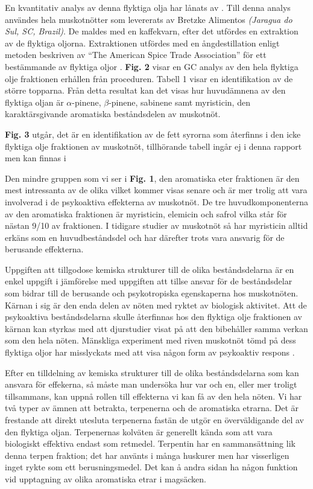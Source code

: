 \documentclass{theme/franska}
\begin{document}
En kvantitativ analys av denna flyktiga olja har lånats av \cite{spricigo1999extraction}.
Till denna analys användes hela muskotnötter som levererats av Bretzke Alimentos \textit{(Jaragua do Sul, SC, Brazil)}. De maldes med en kaffekvarn, efter det utfördes
en extraktion av de flyktiga oljorna. Extraktionen utfördes med en ångdestillation enligt metoden beskriven av ``The American Spice Trade Association'' för ett bestämmande av flyktiga oljor
\cite[citerad av Ferreira]{spricigo1999extraction}.
\textbf{Fig. 2} visar en GC analys av den hela flyktiga olje fraktionen erhållen
från proceduren. Tabell 1 visar en identifikation av de större topparna.
Från detta resultat kan det visas hur huvudämnena av den flyktiga oljan är $\alpha$-pinene, $\beta$-pinene, sabinene samt myristicin, den karaktärsgivande aromatiska beståndsdelen av muskotnöt.

\textbf{Fig. 3} utgår, det är en identifikation av de fett syrorna som återfinns i den icke flyktiga olje fraktionen av muskotnöt, tillhörande tabell ingår ej i denna rapport men kan finnas i \cite[s.258]{spricigo1999extraction}

Den mindre gruppen som vi ser i \textbf{Fig. 1}, den aromatiska
eter fraktionen är den mest intressanta av de olika vilket kommer visas senare
och är mer trolig att vara involverad i de psykoaktiva effekterna av
muskotnöt.
De tre huvudkomponenterna av den aromatiska fraktionen är myristicin, elemicin
och safrol vilka står för nästan 9/10 av fraktionen.
I tidigare studier av muskotnöt så har myristicin alltid erkäns som en
huvudbeståndsdel och har därefter trots vara ansvarig för de berusande effekterna.

Uppgiften att tillgodose kemiska strukturer till de olika beståndsdelarna är
en enkel uppgift i jämförelse med uppgiften att tillse ansvar för de
beståndsdelar som bidrar till de berusande och psykotropiska egenskaperna hos muskotnöten.
Kärnan i sig är den enda delen av nöten med ryktet av biologisk aktivitet.
Att de psykoaktiva beståndsdelarna skulle återfinnas hos den flyktiga olje fraktionen av kärnan kan styrkas med att djurstudier visat på att den bibehåller samma verkan som den hela nöten.
Mänskliga experiment med riven muskotnöt tömd på dess flyktiga oljor har
misslyckats med att visa någon form av psykoaktiv respons \cite{truitt}.

Efter en tilldelning av kemiska strukturer till de olika beståndsdelarna
som kan ansvara för effekerna, så måste man undersöka hur var och en, eller
mer troligt tillsammans, kan uppnå rollen till
effekterna vi kan få av den hela nöten.
Vi har två typer av ämnen att betrakta, terpenerna och de aromatiska etrarna.
Det är frestande att direkt utesluta terpenerna fastän de utgör en överväldigande
del av den flyktiga oljan. Terpenernas kolväten är generellt kända som att vara
biologiskt effektiva endast som retmedel.
Terpentin har en sammansättning lik denna terpen fraktion; det har använts
i många huskurer men har visserligen inget rykte som ett berusningsmedel.
Det kan å andra sidan ha någon funktion vid upptagning av olika aromatiska etrar i
magsäcken.
\end{document}
